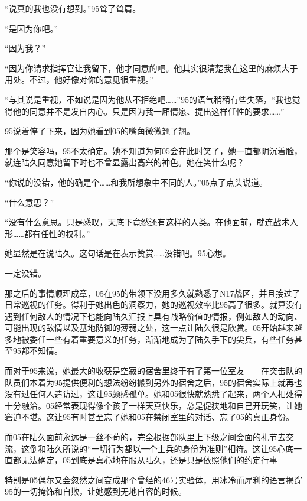 “说真的我也没有想到。”95耸了耸肩。

“是因为你吧。”

“因为我？”

“因为你请求指挥官让我留下，他才同意的吧。他其实很清楚我在这里的麻烦大于用处。不过，他好像对你的意见很重视。”

“与其说是重视，不如说是因为他从不拒绝吧……”95的语气稍稍有些失落，“我也觉得他的同意并不是发自内心。只是因为我一厢情愿、提出这样任性的要求……”

95说着停了下来，因为她看到05的嘴角微微翘了翘。

那个是笑容吗，95不太确定。她不知道为何05会在此时笑了，她一直都阴沉着脸，就连陆久同意她留下时也不曾显露出高兴的神色。她在笑什么呢？

“你说的没错，他的确是个……和我所想象中不同的人。”05点了点头说道。

“什么意思？”

“没有什么意思。只是感叹，天底下竟然还有这样的人类。在他面前，就连战术人形……都有任性的权利。”

她显然是在说陆久。这句话是在表示赞赏……没错吧。95心想。

一定没错。

那之后的事情顺理成章，05在95的带领下没用多久就熟悉了N17战区，并且接过了日常巡视的任务。得利于她出色的洞察力，她的巡视效率比95高了很多。就算没有遇到任何敌人的情况下也能向陆久汇报上具有战略价值的情报，例如敌人的动向、可能出现的敌情以及基地防御的薄弱之处，这一点让陆久很是欣赏。05开始越来越多地被委任一些有着重要意义的任务，渐渐地成为了陆久手下的尖兵，有些任务甚至95都不知情。

而对于95来说，她最大的收获是空寂的宿舍里终于有了第一位室友——在突击队的队员们本着为95提供便利的想法纷纷搬到另外的宿舍之后，95的宿舍实际上就再也没有过任何人造访过，这让95颇感孤单。她和05很快就熟悉了起来，两个人相处得十分融洽。05经常表现得像个孩子一样天真快乐，总是促狭地和自己开玩笑，让她窘迫不堪。这让95有时甚至忘了她和05在禁闭室里的对话、忘了05的真正身份。

而05在陆久面前永远是一丝不苟的，完全根据部队里上下级之间会面的礼节去交流，这倒和陆久所说的“一切行为都以一个士兵的身份为准则”相符。这让95心底一直都无法确定，05到底是真心地在服从陆久，还是只是依照他们的约定行事——

特别是05偶尔又会忽然之间变成那个曾经的46号实验体，用冰冷而犀利的语言揭穿95的一切掩饰和自欺，让她感到无地自容的时候。



